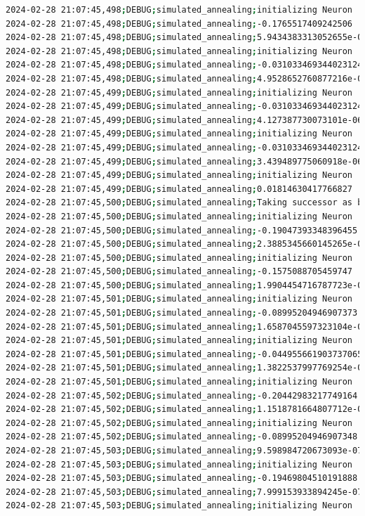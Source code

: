 \documentclass{article}
\begin{document}
\begin{lstlisting}[language=bash, caption=Example Output of Program]
2024-02-28 21:07:45,498;DEBUG;simulated_annealing;initializing Neuron
2024-02-28 21:07:45,498;DEBUG;simulated_annealing;-0.1765517409242506
2024-02-28 21:07:45,498;DEBUG;simulated_annealing;5.9434383313052655e-06
2024-02-28 21:07:45,498;DEBUG;simulated_annealing;initializing Neuron
2024-02-28 21:07:45,498;DEBUG;simulated_annealing;-0.031033469344023124
2024-02-28 21:07:45,498;DEBUG;simulated_annealing;4.9528652760877216e-06
2024-02-28 21:07:45,499;DEBUG;simulated_annealing;initializing Neuron
2024-02-28 21:07:45,499;DEBUG;simulated_annealing;-0.031033469344023124
2024-02-28 21:07:45,499;DEBUG;simulated_annealing;4.127387730073101e-06
2024-02-28 21:07:45,499;DEBUG;simulated_annealing;initializing Neuron
2024-02-28 21:07:45,499;DEBUG;simulated_annealing;-0.031033469344023124
2024-02-28 21:07:45,499;DEBUG;simulated_annealing;3.439489775060918e-06
2024-02-28 21:07:45,499;DEBUG;simulated_annealing;initializing Neuron
2024-02-28 21:07:45,499;DEBUG;simulated_annealing;0.01814630417766827
2024-02-28 21:07:45,500;DEBUG;simulated_annealing;Taking successor as better option (exploitation)
2024-02-28 21:07:45,500;DEBUG;simulated_annealing;initializing Neuron
2024-02-28 21:07:45,500;DEBUG;simulated_annealing;-0.19047393348396455
2024-02-28 21:07:45,500;DEBUG;simulated_annealing;2.3885345660145265e-06
2024-02-28 21:07:45,500;DEBUG;simulated_annealing;initializing Neuron
2024-02-28 21:07:45,500;DEBUG;simulated_annealing;-0.1575088705459747
2024-02-28 21:07:45,500;DEBUG;simulated_annealing;1.9904454716787723e-06
2024-02-28 21:07:45,501;DEBUG;simulated_annealing;initializing Neuron
2024-02-28 21:07:45,501;DEBUG;simulated_annealing;-0.08995204946907373
2024-02-28 21:07:45,501;DEBUG;simulated_annealing;1.6587045597323104e-06
2024-02-28 21:07:45,501;DEBUG;simulated_annealing;initializing Neuron
2024-02-28 21:07:45,501;DEBUG;simulated_annealing;-0.044955661903737065
2024-02-28 21:07:45,501;DEBUG;simulated_annealing;1.3822537997769254e-06
2024-02-28 21:07:45,501;DEBUG;simulated_annealing;initializing Neuron
2024-02-28 21:07:45,502;DEBUG;simulated_annealing;-0.20442983217749164
2024-02-28 21:07:45,502;DEBUG;simulated_annealing;1.1518781664807712e-06
2024-02-28 21:07:45,502;DEBUG;simulated_annealing;initializing Neuron
2024-02-28 21:07:45,502;DEBUG;simulated_annealing;-0.08995204946907348
2024-02-28 21:07:45,503;DEBUG;simulated_annealing;9.598984720673093e-07
2024-02-28 21:07:45,503;DEBUG;simulated_annealing;initializing Neuron
2024-02-28 21:07:45,503;DEBUG;simulated_annealing;-0.19469804510191888
2024-02-28 21:07:45,503;DEBUG;simulated_annealing;7.999153933894245e-07
2024-02-28 21:07:45,503;DEBUG;simulated_annealing;initializing Neuron

\end{lstlisting}
\end{document}
